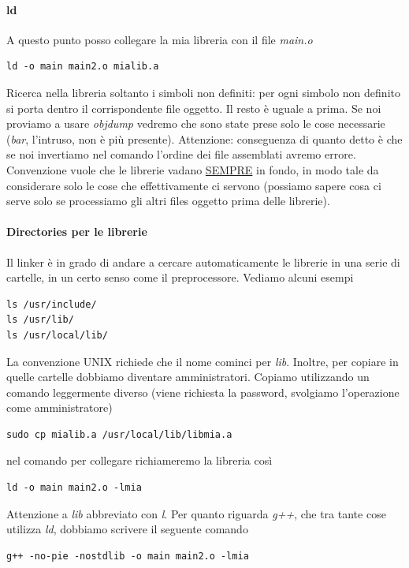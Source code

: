 \documentclass[11pt]{report}
\theoremstyle{definition}
\begin{document}
\paragraph{ld} A questo punto posso collegare la mia libreria con il file \emph{main.o}
\begin{verbatim}
ld -o main main2.o mialib.a
\end{verbatim}
Ricerca nella libreria soltanto i simboli non definiti: per ogni simbolo non definito si porta dentro il corrispondente file oggetto. Il resto è uguale a prima. Se noi proviamo a usare \emph{objdump} vedremo che sono state prese solo le cose necessarie (\emph{bar}, l'intruso, non è più presente). Attenzione: conseguenza di quanto detto è che se noi invertiamo nel comando l'ordine dei file assemblati avremo errore. Convenzione vuole che le librerie vadano \underline{SEMPRE} in fondo, in modo tale da considerare solo le cose che effettivamente ci servono (possiamo sapere cosa ci serve solo se processiamo gli altri files oggetto prima delle librerie).
\paragraph{Directories per le librerie} Il linker è in grado di andare a cercare automaticamente le librerie in una serie di cartelle, in un certo senso come il preprocessore. Vediamo alcuni esempi
\begin{verbatim}
ls /usr/include/
ls /usr/lib/
ls /usr/local/lib/
\end{verbatim}
La convenzione UNIX richiede che il nome cominci per \emph{lib}. Inoltre, per copiare in quelle cartelle dobbiamo diventare amministratori. Copiamo utilizzando un comando leggermente diverso (viene richiesta la password, svolgiamo l'operazione come amministratore)
\begin{verbatim}
sudo cp mialib.a /usr/local/lib/libmia.a
\end{verbatim}
nel comando per collegare richiameremo la libreria così
\begin{verbatim}
ld -o main main2.o -lmia
\end{verbatim}
Attenzione a \emph{lib} abbreviato con \emph{l}. Per quanto riguarda \emph{g++}, che tra tante cose utilizza \emph{ld}, dobbiamo scrivere il seguente comando
\begin{verbatim}
g++ -no-pie -nostdlib -o main main2.o -lmia
\end{verbatim}
\end{document}
